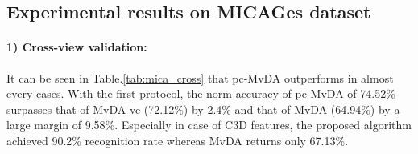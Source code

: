 
\subsection{Experimental results on MICAGes dataset}

    \paragraph{1) Cross-view validation:} It can be seen in Table.\ref{tab:mica_cross} that pc-MvDA outperforms in almost every cases. With the first protocol, the norm accuracy of pc-MvDA of 74.52\% surpasses that of MvDA-vc (72.12\%) by 2.4\% and that of MvDA (64.94\%) by a large margin of 9.58\%. Especially in case of C3D features, the proposed algorithm achieved 90.2\% recognition rate whereas MvDA returns only 67.13\%.

    \begin{table}[htbp]
    \centering
    \caption{Cross-view recognition comparison on MICAGes dataset.}
    \label{tab:mica_cross}
    \end{table}

